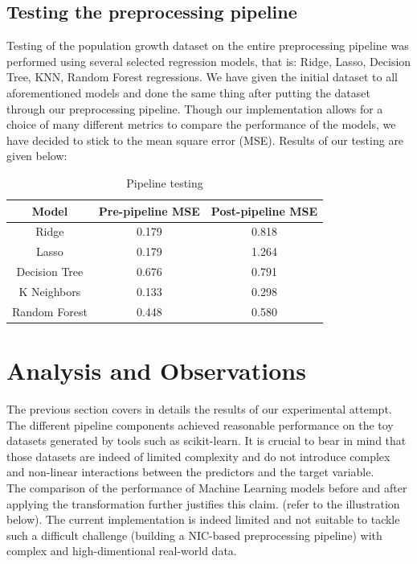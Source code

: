 \documentclass[conference]{IEEEtran}
\begin{document}
\subsection{Testing the preprocessing pipeline}

Testing of the population growth dataset on the entire preprocessing pipeline was performed using several selected regression models, that is: Ridge, Lasso, Decision Tree, KNN, Random Forest regressions. We have given the initial dataset to all aforementioned models and done the same thing after putting the dataset through our preprocessing pipeline. Though our implementation allows for a choice of many different metrics to compare the performance of the models, we have decided to stick to the mean square error (MSE). Results of our testing are given below:

\begin{table}[htbp]
	\caption{Pipeline testing}
	\begin{center}
		\begin{tabular}{|c|c|c|}
			\hline
			\textbf{Model}&\textbf{Pre-pipeline MSE}&\textbf{Post-pipeline MSE}\\
			\hline
			Ridge&0.179&0.818 \\
			\hline
			Lasso&0.179&1.264 \\
			\hline
			Decision Tree&0.676&0.791 \\
			\hline
			K Neighbors&0.133&0.298 \\
			\hline
			Random Forest&0.448&0.580 \\
			\hline
		\end{tabular}
		\label{tab1}
	\end{center}
\end{table}

\section{Analysis and Observations}

The previous section covers in details the results of our experimental attempt. The different pipeline components achieved reasonable performance on the toy datasets generated by tools such as scikit-learn. It is crucial to  bear in mind that those datasets are indeed of limited complexity and do not introduce complex and non-linear interactions between the predictors and the target variable.\\

The comparison of the performance of Machine Learning models before and after applying the transformation further justifies this claim. (refer to the illustration below). The current implementation is indeed limited and not suitable to tackle such a difficult challenge (building a NIC-based preprocessing pipeline) with complex and high-dimentional real-world data. \\
\end{document}
